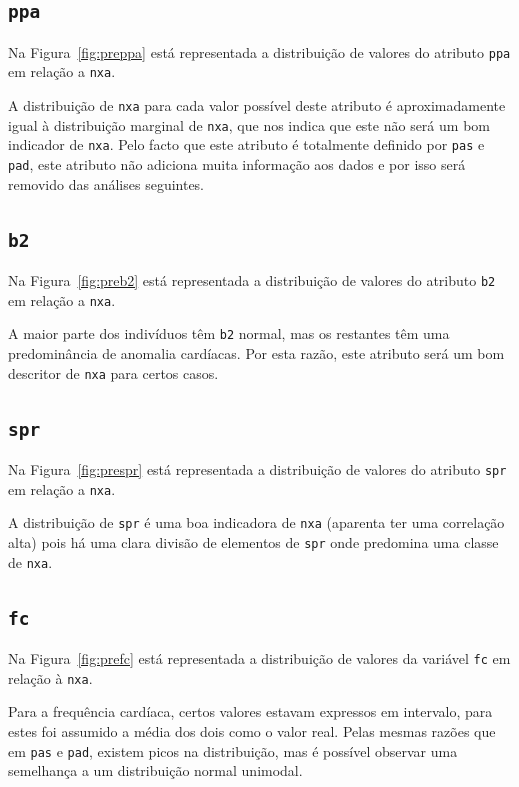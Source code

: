 \documentclass[10pt, conference, compsocconf]{IEEEtran}
\begin{document}
\subsection{\texttt{ppa}}
Na Figura~\ref{fig:preppa} está representada a distribuição de valores
do atributo {\tt ppa} em relação a {\tt nxa}.


A distribuição de {\tt nxa} para cada valor possível deste atributo é
aproximadamente igual à distribuição marginal de {\tt nxa}, que nos
indica que este não será um bom indicador de {\tt nxa}. Pelo facto que
este atributo é totalmente definido por {\tt pas} e {\tt pad}, este
atributo não adiciona muita informação aos dados e por isso será
removido das análises seguintes.

\subsection{\texttt{b2}}
Na Figura~\ref{fig:preb2} está representada a distribuição de valores
do atributo {\tt b2} em relação a {\tt nxa}.


A maior parte dos indivíduos têm {\tt b2} normal, mas os restantes têm
uma predominância de anomalia cardíacas. Por esta razão, este atributo
será um bom descritor de {\tt nxa} para certos casos.

\subsection{\texttt{spr}}
Na Figura~\ref{fig:prespr} está representada a distribuição de valores
do atributo {\tt spr} em relação a {\tt nxa}.


A distribuição de {\tt spr} é uma boa indicadora de {\tt nxa}
(aparenta ter uma correlação alta) pois há uma clara divisão de
elementos de {\tt spr} onde predomina uma classe de {\tt nxa}.

\subsection{\texttt{fc}}
Na Figura~\ref{fig:prefc} está representada a distribuição de valores
da variável {\tt fc} em relação à {\tt nxa}.


Para a frequência cardíaca, certos valores estavam expressos em
intervalo, para estes foi assumido a média dos dois como o valor
real. Pelas mesmas razões que em {\tt pas} e {\tt pad}, existem picos
na distribuição, mas é possível observar uma semelhança a um
distribuição normal unimodal.
\end{document}
